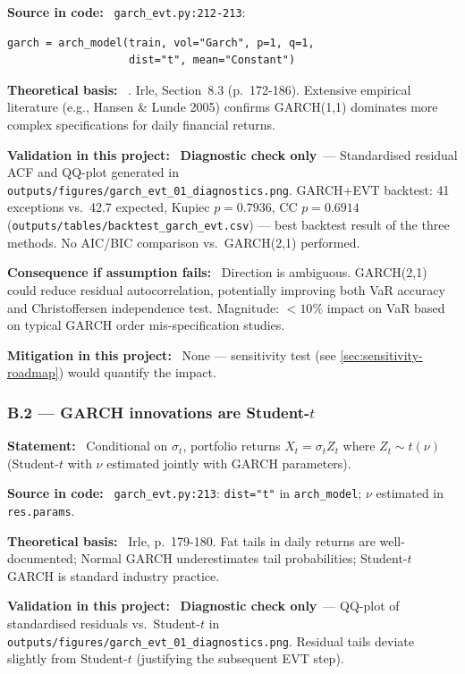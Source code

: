 \documentclass[11pt,a4paper]{article}
\newcommand{\asmfield}[1]{\medskip\noindent\textbf{#1:}\ }
\newcommand{\code}[1]{\texttt{#1}}
\newcommand{\diagnostic}{\textbf{Diagnostic check only}}
\begin{document}
\asmfield{Source in code}
\code{garch\_evt.py:212-213}:
\begin{lstlisting}
garch = arch_model(train, vol="Garch", p=1, q=1,
                   dist="t", mean="Constant")
\end{lstlisting}

\asmfield{Theoretical basis}
\cite{Bollerslev1986}. Irle, Section~8.3 (p.~172-186). Extensive
empirical literature (e.g., Hansen \& Lunde 2005) confirms GARCH(1,1)
dominates more complex specifications for daily financial returns.

\asmfield{Validation in this project}
\diagnostic\ --- Standardised residual ACF and QQ-plot generated in
\code{outputs/figures/garch\_evt\_01\_diagnostics.png}. GARCH+EVT
backtest: 41 exceptions vs.\ 42.7 expected, Kupiec $p = 0.7936$, CC
$p = 0.6914$ (\code{outputs/tables/backtest\_garch\_evt.csv}) --- best
backtest result of the three methods. No AIC/BIC comparison vs.\
GARCH(2,1) performed.

\asmfield{Consequence if assumption fails}
Direction is ambiguous. GARCH(2,1) could reduce residual autocorrelation,
potentially improving both VaR accuracy and Christoffersen independence
test. Magnitude: $< 10\%$ impact on VaR based on typical GARCH order
mis-specification studies.

\asmfield{Mitigation in this project}
None --- sensitivity test (see \cref{sec:sensitivity-roadmap}) would
quantify the impact.

\subsubsection{B.2 --- GARCH innovations are Student-$t$}\label{asm:B2}

\asmfield{Statement}
Conditional on $\sigma_t$, portfolio returns $X_t = \sigma_t Z_t$ where
$Z_t \sim t(\nu)$ (Student-$t$ with $\nu$ estimated jointly with GARCH
parameters).

\asmfield{Source in code}
\code{garch\_evt.py:213}: \lstinline|dist="t"| in \code{arch\_model};
$\nu$ estimated in \code{res.params}.

\asmfield{Theoretical basis}
Irle, p.~179-180. Fat tails in daily returns are well-documented; Normal
GARCH underestimates tail probabilities; Student-$t$ GARCH is standard
industry practice.

\asmfield{Validation in this project}
\diagnostic\ --- QQ-plot of standardised residuals vs.\ Student-$t$ in
\code{outputs/figures/garch\_evt\_01\_diagnostics.png}. Residual tails
deviate slightly from Student-$t$ (justifying the subsequent EVT step).
\end{document}
